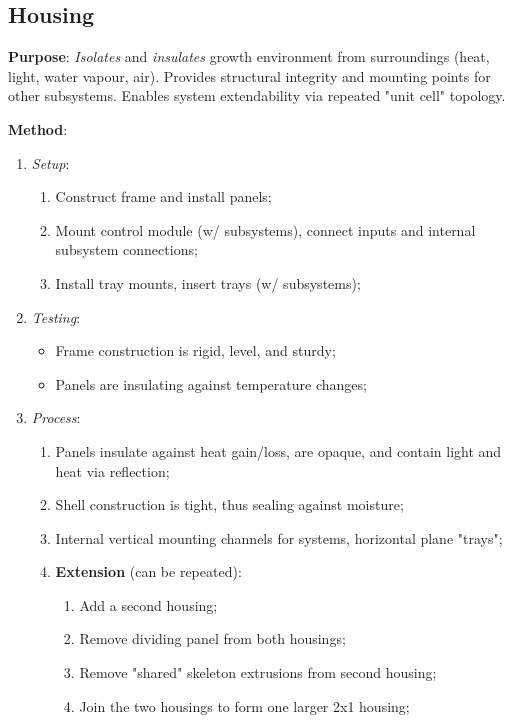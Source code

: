 \subsection{Housing}
\label{sec:housing}

\textbf{Purpose}: \textit{Isolates} and \textit{insulates} growth environment from surroundings (heat, light, water vapour, air). Provides structural integrity and mounting points for other subsystems. Enables system extendability via repeated "unit cell" topology.

\textbf{Method}:
\begin{enumerate}
    \item \textit{Setup}:
    \begin{enumerate}
        \item Construct frame and install panels;
        \item Mount control module (w/ subsystems), connect inputs and internal subsystem connections;
        \item Install tray mounts, insert trays (w/ subsystems);
    \end{enumerate}
    \item \textit{Testing}:
    \begin{itemize}
        \item Frame construction is rigid, level, and sturdy;
        \item Panels are insulating against temperature changes;
    \end{itemize}
    \item \textit{Process}:
    \begin{enumerate}
        \item Panels insulate against heat gain/loss, are opaque, and contain light and heat via reflection;
        \item Shell construction is tight, thus sealing against moisture;
        \item Internal vertical mounting channels for systems, horizontal plane "trays";
        \item \textbf{Extension} (can be repeated):
        \begin{enumerate}
            \item Add a second housing;
            \item Remove dividing panel from both housings;
            \item Remove "shared" skeleton extrusions from second housing;
            \item Join the two housings to form one larger 2x1 housing;

\end{enumerate}
\end{enumerate}
\end{enumerate}
